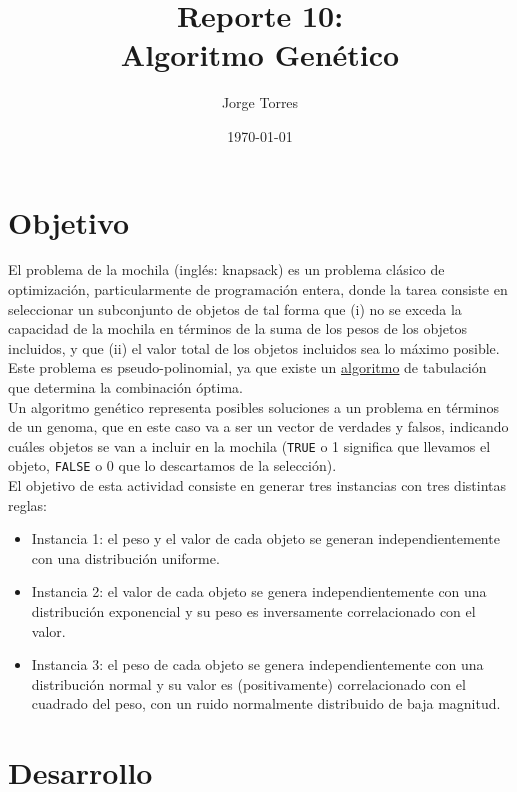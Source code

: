 \documentclass{article}
\title{Reporte 10:\\Algoritmo Gen\'etico}
\author{Jorge Torres}
\date{\today}
\begin{document}
\maketitle

\section{Objetivo}\label{obj}
El problema de la mochila (ingl\'es: knapsack) es un problema cl\'asico de optimización, particularmente de programaci\'on entera, donde la tarea consiste en seleccionar un subconjunto de objetos de tal forma que (i) no se exceda la capacidad de la mochila en t\'erminos de la suma de los pesos de los objetos incluidos, y que (ii) el valor total de los objetos incluidos sea lo máximo posible. Este problema es pseudo-polinomial, ya que existe un \href{https://github.com/satuelisa/Simulation/blob/master/GeneticAlgorithm/knapsack.py}{algoritmo} de tabulaci\'on que determina la combinación óptima.\\

Un algoritmo genético representa posibles soluciones a un problema en términos de un genoma, que en este caso va a ser un vector de verdades y falsos, indicando cuáles objetos se van a incluir en la mochila (\texttt{TRUE} o 1 significa que llevamos el objeto, \texttt{FALSE} o 0 que lo descartamos de la selección).\\

El objetivo de esta actividad consiste en generar tres instancias con tres distintas reglas:

\begin{itemize}
    \item Instancia 1: el peso y el valor de cada objeto se generan independientemente con una distribución uniforme.
    \item Instancia 2: el valor de cada objeto se genera independientemente con una distribución exponencial y su peso es inversamente correlacionado con el valor.
    \item Instancia 3: el peso de cada objeto se genera independientemente con una distribución normal y su valor es (positivamente) correlacionado con el cuadrado del peso, con un ruido normalmente distribuido de baja magnitud.
\end{itemize}

\section{Desarrollo}
\end{document}
